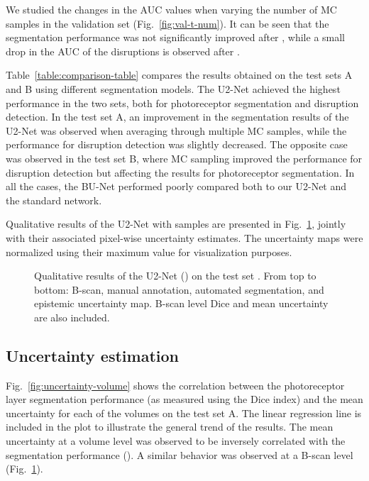 We studied the changes in the AUC values when varying the number of MC samples  in the validation set (Fig.~\ref{fig:val-t-num}). It can be seen that the segmentation performance was not significantly improved after , while a small drop in the AUC of the disruptions is observed after . 

Table~\ref{table:comparison-table} compares the results obtained on the test sets A and B using different segmentation models. The U2-Net achieved the highest performance in the two sets, both for photoreceptor segmentation and disruption detection. In the test set A, an improvement in the segmentation results of the U2-Net was observed when averaging through multiple MC samples, while the performance for disruption detection was slightly decreased. The opposite case was observed in the test set B, where MC sampling improved the performance for disruption detection but affecting the results for photoreceptor segmentation. In all the cases, the BU-Net performed poorly compared both to our U2-Net and the standard network.

Qualitative results of the U2-Net with  samples are presented in Fig.~\ref{fig:qualitative-results}, jointly with their associated pixel-wise uncertainty estimates. The uncertainty maps were normalized using their maximum value for visualization purposes.


\begin{figure}[t]
 \centering
{}
 \caption{Qualitative results of the U2-Net () on the test set . From top to bottom: B-scan, manual annotation, automated segmentation, and epistemic uncertainty map. B-scan level Dice and mean uncertainty  are also included.}
 \label{fig:qualitative-results}
\end{figure}


\subsection{Uncertainty estimation}

Fig.~\ref{fig:uncertainty-volume} shows the correlation between the photoreceptor layer segmentation performance (as measured using the Dice index) and the mean uncertainty for each of the volumes on the test set A. The linear regression line is included in the plot to illustrate the general trend of the results. The mean uncertainty at a volume level was observed to be inversely correlated with the segmentation performance (). A similar behavior was observed at a B-scan level (Fig.~\ref{fig:qualitative-results}).




